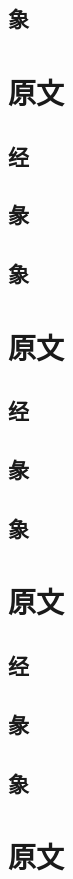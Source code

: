 \documentclass[12pt,oneside]{book}
\begin{document}
\subsection{象}

\section{原文}
\subsection{经}
\subsection{彖}
\subsection{象}

\section{原文}
\subsection{经}
\subsection{彖}
\subsection{象}

\section{原文}
\subsection{经}
\subsection{彖}
\subsection{象}

\section{原文}
\end{document}
